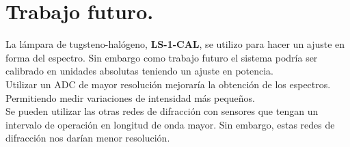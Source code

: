 \chapter*{Trabajo futuro.}
La lámpara de tugsteno-halógeno, \textbf{LS-1-CAL}, se utilizo para hacer un ajuste en forma del espectro. Sin embargo como trabajo futuro el sistema podría ser calibrado en unidades absolutas teniendo un ajuste en potencia. \\

Utilizar un ADC de mayor resolución mejoraría la obtención de los espectros. Permitiendo medir variaciones de intensidad más pequeños.\\

Se pueden utilizar las otras redes de difracción con sensores que tengan un intervalo de operación en longitud de onda mayor. Sin embargo, estas redes de difracción nos darían menor resolución. 
